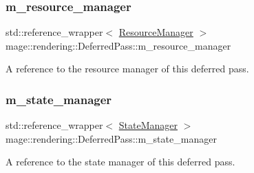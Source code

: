 \subsubsection{\texorpdfstring{m\+\_\+resource\+\_\+manager}{m\_resource\_manager}}
{\footnotesize\ttfamily std\+::reference\+\_\+wrapper$<$ \mbox{\hyperlink{classmage_1_1rendering_1_1_resource_manager}{Resource\+Manager}} $>$ mage\+::rendering\+::\+Deferred\+Pass\+::m\+\_\+resource\+\_\+manager\hspace{0.3cm}{\ttfamily [private]}}

A reference to the resource manager of this deferred pass. \mbox{\label{classmage_1_1rendering_1_1_deferred_pass_aaeabb408d0454f13fdabad2a8e668f61}} 
\subsubsection{\texorpdfstring{m\+\_\+state\+\_\+manager}{m\_state\_manager}}
{\footnotesize\ttfamily std\+::reference\+\_\+wrapper$<$ \mbox{\hyperlink{classmage_1_1rendering_1_1_state_manager}{State\+Manager}} $>$ mage\+::rendering\+::\+Deferred\+Pass\+::m\+\_\+state\+\_\+manager\hspace{0.3cm}{\ttfamily [private]}}

A reference to the state manager of this deferred pass. 